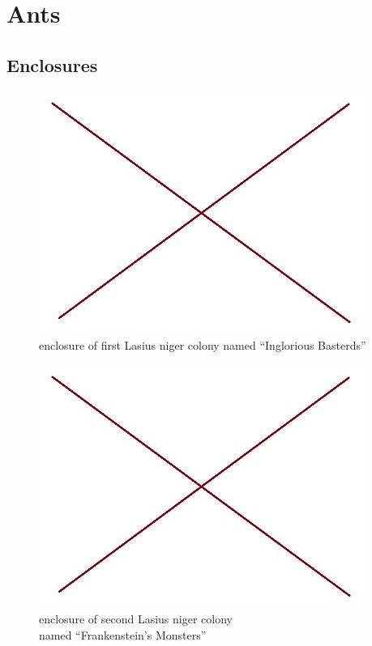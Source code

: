 \chapter{Ants}

\section{Enclosures}
\begin{figure}[H]
  \centering
  \includegraphics[scale=0.5]{resources/L-niger1.jpg}
  \caption[Lniger1]{enclosure of first Lasius niger colony named ``Inglorious Basterds''}
\end{figure}
\begin{figure}[H]
  \centering
  \includegraphics[scale=0.5]{resources/L-niger2.jpg}
  \caption[L. niger 1]{enclosure of second Lasius niger colony\\named ``Frankenstein's Monsters''}
\end{figure}
